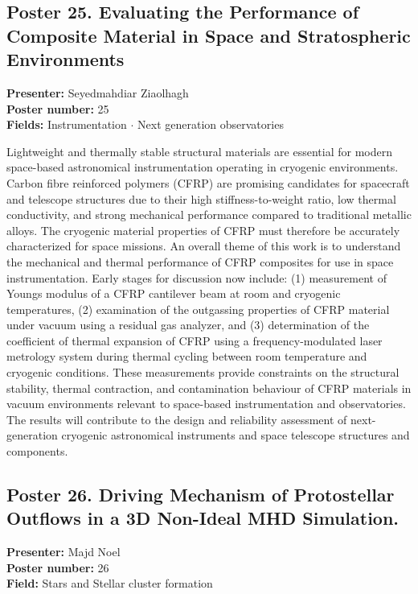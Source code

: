 \hypertarget{poster-abstract-talk-254}{}\label{poster-abstract-page-talk-254}
\subsection*{Poster 25. Evaluating the Performance of Composite Material in Space and Stratospheric Environments}
\textbf{Presenter:} Seyedmahdiar Ziaolhagh\\
\textbf{Poster number:} 25\\
\textbf{Fields:} Instrumentation $\cdot$ Next generation observatories

Lightweight and thermally stable structural materials are essential for modern space-based astronomical instrumentation operating in cryogenic environments. Carbon fibre reinforced polymers (CFRP) are promising candidates for spacecraft and telescope structures due to their high stiffness-to-weight ratio, low thermal conductivity, and strong mechanical performance compared to traditional metallic alloys. The cryogenic material properties of CFRP must therefore be accurately characterized for space missions. An overall theme of this work is to understand the mechanical and thermal performance of CFRP composites for use in space instrumentation. Early stages for discussion now include: (1) measurement of Youngs modulus of a CFRP cantilever beam at room and cryogenic temperatures, (2) examination of the outgassing properties of CFRP material under vacuum using a residual gas analyzer, and (3) determination of the coefficient of thermal expansion of CFRP using a frequency-modulated laser metrology system during thermal cycling between room temperature and cryogenic conditions. These measurements provide constraints on the structural stability, thermal contraction, and contamination behaviour of CFRP materials in vacuum environments relevant to space-based instrumentation and observatories. The results will contribute to the design and reliability assessment of next-generation cryogenic astronomical instruments and space telescope structures and components.

\hypertarget{poster-abstract-talk-114}{}\label{poster-abstract-page-talk-114}
\subsection*{Poster 26. Driving Mechanism of Protostellar Outflows in a 3D Non-Ideal MHD Simulation.}
\textbf{Presenter:} Majd Noel\\
\textbf{Poster number:} 26\\
\textbf{Field:} Stars and Stellar cluster formation

